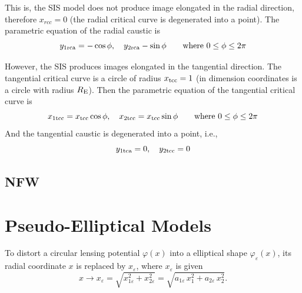 This is, the SIS model does not produce image elongated in the radial direction, therefore $x_{rcc}=0$ (the radial critical curve is degenerated into a point). The parametric equation of the radial caustic is
\begin{equation}
y_{1{\rm rca}}=-\cos{\phi}, \quad y_{2{\rm rca}}-\sin{\phi} \qquad \textrm{where\ } 0\leq \phi \leq 2\pi 
\end{equation}

However, the SIS produces images elongated in the tangential direction. The tangential critical curve is a circle of radius $x_{\rm tcc}=1$ (in dimension coordinates is a circle with radius $R_{\rm E}$). Then the parametric equation of the tangential critical curve is
\begin{equation}
x_{1{\rm tcc}}=x_{\rm tcc}\cos{\phi}, \quad x_{2{\rm tcc}}=x_{\rm tcc}\sin{\phi} \qquad \textrm{where\ } 0\leq \phi \leq 2\pi 
\end{equation}
And the tangential caustic is degenerated into a point, i.e.,
\begin{equation}
y_{1{\rm tca}}=0, \quad y_{2{\rm tcc}}=0 
\end{equation}

\subsection{NFW}

\section{Pseudo-Elliptical Models}
To distort a circular lensing potential $\varphi(x)$ into a elliptical shape $\varphi_\varepsilon(x)$, its radial
coordinate $x$ is replaced by $x_\varepsilon$, where $x_\varepsilon$ is given 
\begin{equation}
 x \rightarrow x_\varepsilon = \sqrt{x^2_{1\varepsilon}+x^2_{2\varepsilon}}=
\sqrt{a_{1\varepsilon}\,x^2_1+a_{2\varepsilon}\,x^2_2}.%
\label{subti-ellip}
\end{equation}

